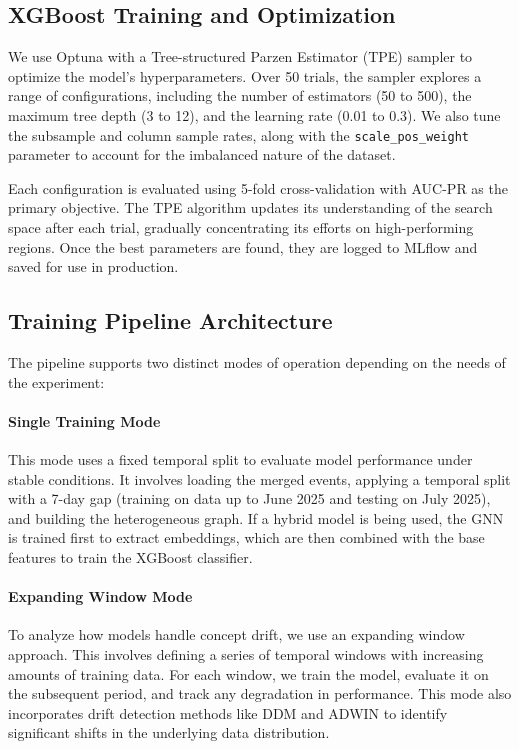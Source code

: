 \subsection{XGBoost Training and Optimization}
\label{sec:4_7_2}

We use Optuna with a Tree-structured Parzen Estimator (TPE) sampler to optimize the model's hyperparameters. Over 50 trials, the sampler explores a range of configurations, including the number of estimators (50 to 500), the maximum tree depth (3 to 12), and the learning rate (0.01 to 0.3). We also tune the subsample and column sample rates, along with the \texttt{scale\_pos\_weight} parameter to account for the imbalanced nature of the dataset.

Each configuration is evaluated using 5-fold cross-validation with AUC-PR as the primary objective. The TPE algorithm updates its understanding of the search space after each trial, gradually concentrating its efforts on high-performing regions. Once the best parameters are found, they are logged to MLflow and saved for use in production.

\subsection{Training Pipeline Architecture}

The pipeline supports two distinct modes of operation depending on the needs of the experiment:

\paragraph{Single Training Mode}
This mode uses a fixed temporal split to evaluate model performance under stable conditions. It involves loading the merged events, applying a temporal split with a 7-day gap (training on data up to June 2025 and testing on July 2025), and building the heterogeneous graph. If a hybrid model is being used, the GNN is trained first to extract embeddings, which are then combined with the base features to train the XGBoost classifier.

\paragraph{Expanding Window Mode}
To analyze how models handle concept drift, we use an expanding window approach. This involves defining a series of temporal windows with increasing amounts of training data. For each window, we train the model, evaluate it on the subsequent period, and track any degradation in performance. This mode also incorporates drift detection methods like DDM and ADWIN to identify significant shifts in the underlying data distribution.

